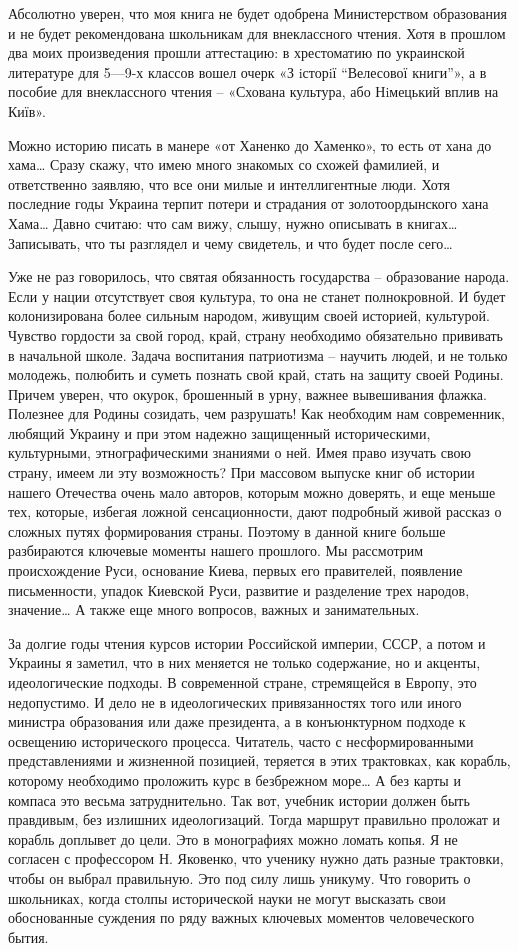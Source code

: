 Абсолютно уверен, что моя книга не будет одобрена Министерством образования и
не будет рекомендована школьникам для внеклассного чтения. Хотя в прошлом два
моих произведения прошли аттестацию: в хрестоматию по украинской литературе для
5—9-х классов вошел очерк «З iсторiї “Велесової книги”», а в пособие для
внеклассного чтения – «Схована культура, або Нiмецький вплив на Київ».

Можно историю писать в манере «от Ханенко до Хаменко», то есть от хана до хама…
Сразу скажу, что имею много знакомых со схожей фамилией, и ответственно
заявляю, что все они милые и интеллигентные люди. Хотя последние годы Украина
терпит потери и страдания от золотоордынского хана Хама… Давно считаю: что сам
вижу, слышу, нужно описывать в книгах… Записывать, что ты разглядел и чему
свидетель, и что будет после сего…

Уже не раз говорилось, что святая обязанность государства – образование народа.
Если у нации отсутствует своя культура, то она не станет полнокровной. И будет
колонизирована более сильным народом, живущим своей историей, культурой.
Чувство гордости за свой город, край, страну необходимо обязательно прививать в
начальной школе. Задача воспитания патриотизма – научить людей, и не только
молодежь, полюбить и суметь познать свой край, стать на защиту своей Родины.
Причем уверен, что окурок, брошенный в урну, важнее вывешивания флажка.
Полезнее для Родины созидать, чем разрушать! Как необходим нам современник,
любящий Украину и при этом надежно защищенный историческими, культурными,
этнографическими знаниями о ней. Имея право изучать свою страну, имеем ли эту
возможность? При массовом выпуске книг об истории нашего Отечества очень мало
авторов, которым можно доверять, и еще меньше тех, которые, избегая ложной
сенсационности, дают подробный живой рассказ о сложных путях формирования
страны. Поэтому в данной книге больше разбираются ключевые моменты нашего
прошлого. Мы рассмотрим происхождение Руси, основание Киева, первых его
правителей, появление письменности, упадок Киевской Руси, развитие и разделение
трех народов, значение… А также еще много вопросов, важных и занимательных.

За долгие годы чтения курсов истории Российской империи, СССР, а потом и
Украины я заметил, что в них меняется не только содержание, но и акценты,
идеологические подходы. В современной стране, стремящейся в Европу, это
недопустимо. И дело не в идеологических привязанностях того или иного министра
образования или даже президента, а в конъюнктурном подходе к освещению
исторического процесса. Читатель, часто с несформированными представлениями и
жизненной позицией, теряется в этих трактовках, как корабль, которому
необходимо проложить курс в безбрежном море… А без карты и компаса это весьма
затруднительно. Так вот, учебник истории должен быть правдивым, без излишних
идеологизаций. Тогда маршрут правильно проложат и корабль доплывет до цели. Это
в монографиях можно ломать копья. Я не согласен с профессором Н. Яковенко, что
ученику нужно дать разные трактовки, чтобы он выбрал правильную. Это под силу
лишь уникуму. Что говорить о школьниках, когда столпы исторической науки не
могут высказать свои обоснованные суждения по ряду важных ключевых моментов
человеческого бытия.
	
